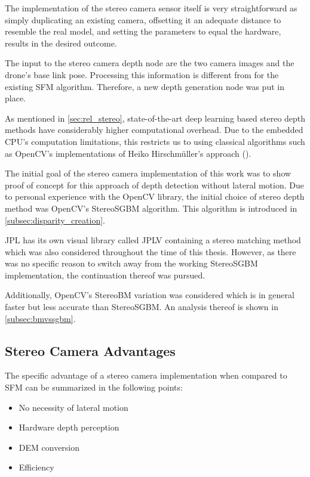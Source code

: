 The implementation of the stereo camera sensor itself is very straightforward as simply duplicating an existing camera, offsetting it an adequate distance to resemble the real model, and setting the parameters to equal the hardware, results in the desired outcome.

The input to the stereo camera depth node are the two camera images and the drone's base link pose. Processing this information is different from for the existing SFM algorithm. Therefore, a new depth generation node was put in place. 

As mentioned in \cref{sec:rel_stereo}, state-of-the-art deep learning based stereo depth methods have considerably higher computational overhead. Due to the embedded CPU's computation limitations, this restricts us to using classical algorithms such as OpenCV's implementations of Heiko Hirschmüller's approach (\citep{Stereo}).

The initial goal of the stereo camera implementation of this work was to show proof of concept for this approach of depth detection without lateral motion. Due to personal experience with the OpenCV library, the initial choice of stereo depth method was OpenCV's StereoSGBM algorithm. This algorithm is introduced in \cref{subsec:disparity_creation}.

JPL has its own visual library called JPLV containing a stereo matching method which was also considered throughout the time of this thesis. However, as there was no specific reason to switch away from the working StereoSGBM implementation, the continuation thereof was pursued.

Additionally, OpenCV's StereoBM variation was considered which is in general faster but less accurate than StereoSGBM. An analysis thereof is shown in \cref{subsec:bmvssgbm}.




\subsection{Stereo Camera Advantages}

The specific advantage of a stereo camera implementation when compared to SFM can be summarized in the following points:

\begin{itemize}
    \item No necessity of lateral motion
    \item Hardware depth perception
    \item DEM conversion
    \item Efficiency
\end{itemize}

